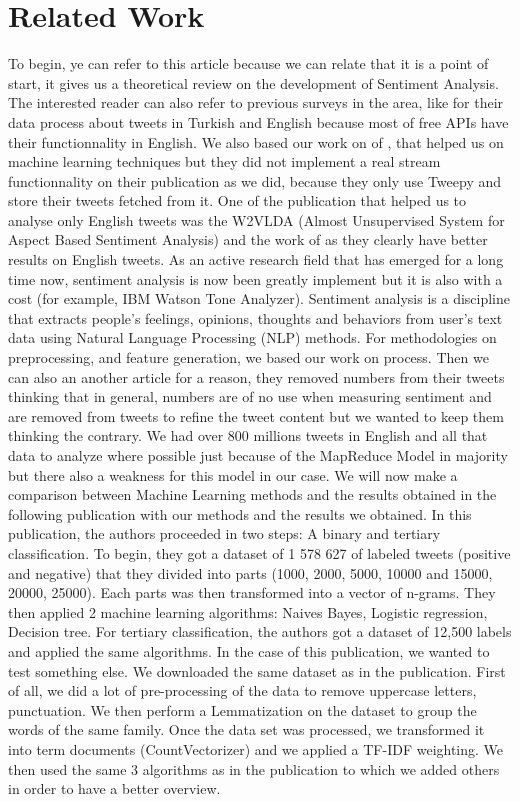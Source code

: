 \documentclass{acmtog} %
\begin{document}
\section{Related Work}
\label{sec:related_work}
To begin, ye can refer to this article \cite{Palpanas11} because we can relate that it is a point of start, it gives us a theoretical review on the development of Sentiment Analysis. The interested reader can also refer to previous surveys in the area, like \cite{Ayvazb17} for their data process about tweets in Turkish and English  because most of free APIs have their functionnality in English. We also based our work on of \cite{Badhani17}, that helped us on machine learning techniques but they did not implement a real stream functionnality on their publication as we did, because they only use Tweepy and store their tweets fetched from it. One of the publication that helped us to analyse only English tweets was the W2VLDA (Almost Unsupervised System for Aspect Based Sentiment Analysis) and the work of \cite{Cuadros17} as they clearly have better results on English tweets. As an active research field that has emerged for a long time now, sentiment analysis is now been greatly implement but it is also with a cost (for example, IBM Watson Tone Analyzer). Sentiment analysis is a discipline that extracts people's feelings, opinions, thoughts and behaviors from user's text data using Natural Language Processing (NLP) \cite{Rebecca11} methods. For methodologies on preprocessing, and feature generation, we based our work on process. Then we can also an another article for a reason, they removed numbers from their tweets \cite{Lin18}  thinking that in general, numbers are of no use when measuring sentiment and are removed from tweets to refine the tweet content but we wanted to keep them thinking the contrary. We had over 800 millions tweets in English and all that data to analyze where possible just because of the MapReduce Model in majority but there also a weakness for this model in our case.
We will now make a comparison between Machine Learning methods and the results obtained in the following publication \cite{Baltas17} with our methods and the results we obtained.
In this publication, the authors proceeded in two steps: A binary and tertiary classification. To begin, they got a dataset of  1 578 627 of labeled tweets (positive and negative) that they divided into parts (1000, 2000, 5000, 10000 and 15000,  20000, 25000). Each parts was then transformed into a vector of n-grams. They then applied 2 machine learning algorithms: Naives Bayes, Logistic regression, Decision tree. For tertiary classification, the authors got a dataset of 12,500 labels and applied the same algorithms.
In the case of this publication, we wanted to test something else. We downloaded the same dataset as in the publication. First of all, we did a lot of pre-processing of the data to remove uppercase letters, punctuation. We then perform a Lemmatization on the dataset to group the words of the same family. Once the data set was processed, we transformed it into term documents (CountVectorizer) and we applied a TF-IDF weighting.
We then used the same 3 algorithms as in the publication to which we added others in order to have a better overview.
\end{document}
